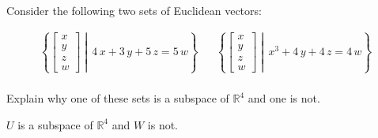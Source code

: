 
\begin{exerciseStatement}


Consider the following two sets of Euclidean vectors: 


\begin{align*}  \left\{ \left[\begin{array}{c}
x \\
y \\
z \\
w
\end{array}\right] \middle|\,4 \, x + 3 \, y + 5 \, z = 5 \, w\right\}  & &   \left\{ \left[\begin{array}{c}
x \\
y \\
z \\
w
\end{array}\right] \middle|\,x^{3} + 4 \, y + 4 \, z = 4 \, w\right\}  \\ \end{align*}
            

 Explain why one of these sets is a subspace of \(\mathbb{R}^ 4 \) and one is not. 


\end{exerciseStatement}
    
\begin{exerciseAnswer} 


\(U\) is a subspace of \(\mathbb{R}^ 4 \) and \(W\) is not.


\end{exerciseAnswer}
    
